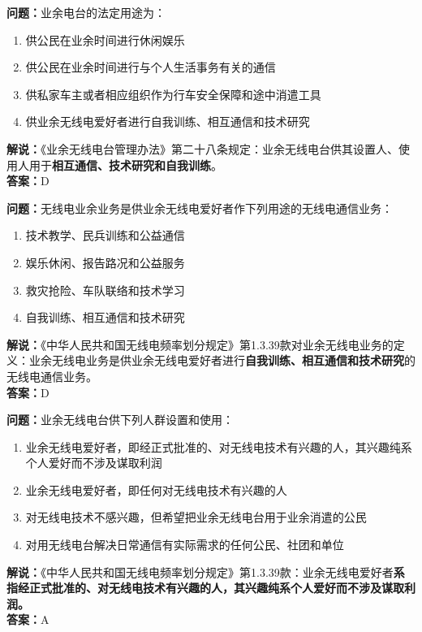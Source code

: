 \bigskip


\noindent\textbf{问题：}业余电台的法定用途为：
\begin{enumerate}[label=\Alph*), leftmargin=3em]
	\item 供公民在业余时间进行休闲娱乐
	\item 供公民在业余时间进行与个人生活事务有关的通信
	\item 供私家车主或者相应组织作为行车安全保障和途中消遣工具
	\item 供业余无线电爱好者进行自我训练、相互通信和技术研究
\end{enumerate}
\noindent\textbf{解说：}《业余无线电台管理办法》第二十八条规定：业余无线电台供其设置人、使用人用于\textbf{相互通信、技术研究和自我训练}。\\\noindent\textbf{答案：}D


\bigskip


\noindent\textbf{问题：}无线电业余业务是供业余无线电爱好者作下列用途的无线电通信业务：
\begin{enumerate}[label=\Alph*), leftmargin=3em]
	\item 技术教学、民兵训练和公益通信
	\item 娱乐休闲、报告路况和公益服务
	\item 救灾抢险、车队联络和技术学习
	\item 自我训练、相互通信和技术研究
\end{enumerate}
\noindent\textbf{解说：}《中华人民共和国无线电频率划分规定》第1.3.39款对业余无线电业务的定义：业余无线电业务是供业余无线电爱好者进行\textbf{自我训练、相互通信和技术研究}的无线电通信业务。\\\noindent\textbf{答案：}D



\bigskip


\noindent\textbf{问题：}业余无线电台供下列人群设置和使用：
\begin{enumerate}[label=\Alph*), leftmargin=3em]
	\item 业余无线电爱好者，即经正式批准的、对无线电技术有兴趣的人，其兴趣纯系个人爱好而不涉及谋取利润
	\item 业余无线电爱好者，即任何对无线电技术有兴趣的人
	\item 对无线电技术不感兴趣，但希望把业余无线电台用于业余消遣的公民
	\item 对用无线电台解决日常通信有实际需求的任何公民、社团和单位
\end{enumerate}
\noindent\textbf{解说：}《中华人民共和国无线电频率划分规定》第1.3.39款：业余无线电爱好者\textbf{系指经正式批准的、对无线电技术有兴趣的人，其兴趣纯系个人爱好而不涉及谋取利润。}\\\noindent\textbf{答案：}A

